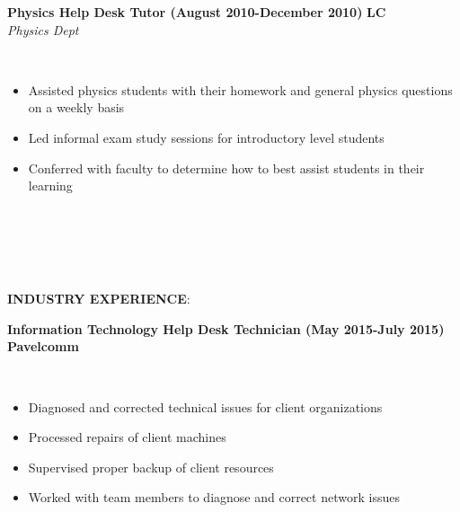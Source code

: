\documentclass{article}
\begin{document}
%
%
%
%
\newpage
\begin{vwcol}[widths={0.8,0.2}, sep=.8cm, justify=flush, rule=0pt, indent=0em]
\noindent \textbf{Physics Help Desk Tutor (August 2010-December 2010)}
\newpage
\noindent \textbf{LC}\\
\noindent \emph{Physics Dept}
\end{vwcol}
\phantom \\
\begin{itemize}
\item Assisted physics students with their homework and general physics questions on a weekly basis
\item Led informal exam study sessions for introductory level students
\item Conferred with faculty to determine how to best assist students in their learning
\end{itemize}
\phantom \\
\phantom \\
%
%
%
%
\par
\phantom \\
\phantom \\
\noindent \textbf{INDUSTRY EXPERIENCE}:\\
\begin{vwcol}[widths={0.8,0.2}, sep=.8cm, justify=flush, rule=0pt, indent=0em]
\noindent \textbf{Information Technology Help Desk Technician (May 2015-July 2015)}
\newpage
\noindent \textbf{Pavelcomm}
\end{vwcol}
\phantom \\
\begin{itemize}
\item Diagnosed and corrected technical issues for client organizations
\item Processed repairs of client machines
\item Supervised proper backup of client resources
\item Worked with team members to diagnose and correct network issues
\end{itemize}
\end{document}
